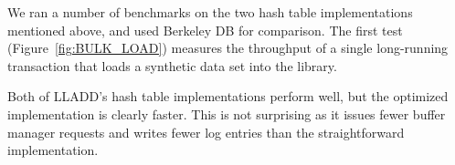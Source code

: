 \documentclass[10pt,letterpaper,twocolumn,english]{article}
\newcommand{\yad}{LLADD\xspace}
\newcommand{\eab}[1]{\textcolor{red}{\bf EAB: #1}}
\begin{document}
We ran a number of benchmarks on the two hash table implementations
mentioned above, and used Berkeley DB for comparison.
The first test (Figure~\ref{fig:BULK_LOAD}) measures the throughput of
a single long-running
transaction that loads a synthetic data set into the
library. 

Both of \yad's hash table implementations perform well, but the
optimized implementation is clearly faster.  This is not surprising as
it issues fewer buffer manager requests and writes fewer log entries
than the straightforward implementation.



\end{document}
